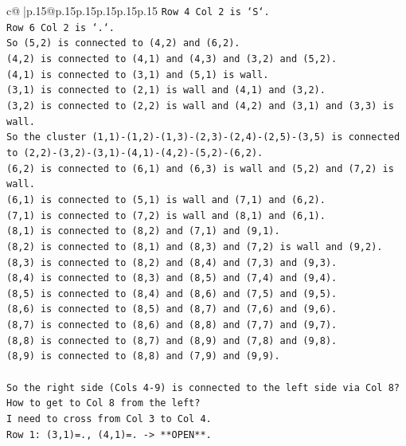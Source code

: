 \documentclass{article}
\begin{document}
{\begin{supertabular}{c@{$\;$}|p{.15\linewidth}@{}p{.15\linewidth}p{.15\linewidth}p{.15\linewidth}p{.15\linewidth}p{.15\linewidth}}
{{{\texttt{Row 4 Col 2 is `S`.} \\
\texttt{Row 6 Col 2 is `.`.} \\
\texttt{So (5,2) is connected to (4,2) and (6,2).} \\
\texttt{(4,2) is connected to (4,1) and (4,3) and (3,2) and (5,2).} \\
\texttt{(4,1) is connected to (3,1) and (5,1) is wall.} \\
\texttt{(3,1) is connected to (2,1) is wall and (4,1) and (3,2).} \\
\texttt{(3,2) is connected to (2,2) is wall and (4,2) and (3,1) and (3,3) is wall.} \\
\texttt{So the cluster (1,1){-}(1,2){-}(1,3){-}(2,3){-}(2,4){-}(2,5){-}(3,5) is connected to (2,2){-}(3,2){-}(3,1){-}(4,1){-}(4,2){-}(5,2){-}(6,2).} \\
\texttt{(6,2) is connected to (6,1) and (6,3) is wall and (5,2) and (7,2) is wall.} \\
\texttt{(6,1) is connected to (5,1) is wall and (7,1) and (6,2).} \\
\texttt{(7,1) is connected to (7,2) is wall and (8,1) and (6,1).} \\
\texttt{(8,1) is connected to (8,2) and (7,1) and (9,1).} \\
\texttt{(8,2) is connected to (8,1) and (8,3) and (7,2) is wall and (9,2).} \\
\texttt{(8,3) is connected to (8,2) and (8,4) and (7,3) and (9,3).} \\
\texttt{(8,4) is connected to (8,3) and (8,5) and (7,4) and (9,4).} \\
\texttt{(8,5) is connected to (8,4) and (8,6) and (7,5) and (9,5).} \\
\texttt{(8,6) is connected to (8,5) and (8,7) and (7,6) and (9,6).} \\
\texttt{(8,7) is connected to (8,6) and (8,8) and (7,7) and (9,7).} \\
\texttt{(8,8) is connected to (8,7) and (8,9) and (7,8) and (9,8).} \\
\texttt{(8,9) is connected to (8,8) and (7,9) and (9,9).} \\
\\ 
\texttt{So the right side (Cols 4{-}9) is connected to the left side via Col 8?} \\
\texttt{How to get to Col 8 from the left?} \\
\texttt{I need to cross from Col 3 to Col 4.} \\
\texttt{Row 1: (3,1)=., (4,1)=. {-}> **OPEN**.} \\
}}}
\end{supertabular}}
\end{document}
